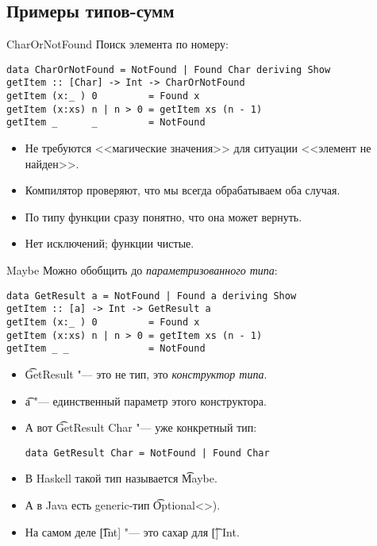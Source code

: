 \subsection{Примеры типов-сумм}
\begin{frame}
\end{frame}

\begin{frame}[fragile]{CharOrNotFound}
	Поиск элемента по номеру:
\begin{verbatim}
data CharOrNotFound = NotFound | Found Char deriving Show
getItem :: [Char] -> Int -> CharOrNotFound
getItem (x:_ ) 0         = Found x
getItem (x:xs) n | n > 0 = getItem xs (n - 1)
getItem _      _         = NotFound
\end{verbatim}
	\begin{itemize}
		\item Не требуются <<магические значения>> для ситуации <<элемент не найден>>.
		\item Компилятор проверяют, что мы всегда обрабатываем оба случая.
		\item По типу функции сразу понятно, что она может вернуть.
		\item Нет исключений; функции чистые.
	\end{itemize}	
\end{frame}


\begin{frame}[fragile]{Maybe}
	Можно обобщить до \textit{параметризованного типа}:
\begin{verbatim}
data GetResult a = NotFound | Found a deriving Show
getItem :: [a] -> Int -> GetResult a
getItem (x:_ ) 0         = Found x
getItem (x:xs) n | n > 0 = getItem xs (n - 1)
getItem _ _              = NotFound
\end{verbatim}
	\begin{itemize}
		\item \t{GetResult} "--- это не тип, это \textit{конструктор типа}.
		\item \t{a} "--- единственный параметр этого конструктора.
		\item А вот \t{GetResult Char} "--- уже конкретный тип:
\begin{verbatim}
data GetResult Char = NotFound | Found Char
\end{verbatim}
		\item В Haskell такой тип называется \t{Maybe}.
		\item А в Java есть generic-тип \t{Optional<>}).
		\item На самом деле \t{[Int]} "--- это сахар для \t{[] Int}.
	\end{itemize}
\end{frame}

